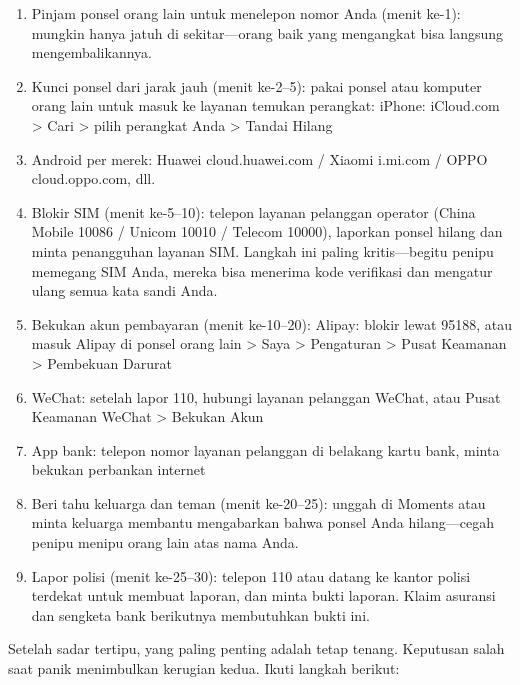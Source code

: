 \begin{enumerate}
  \item Pinjam ponsel orang lain untuk menelepon nomor Anda (menit ke-1): mungkin hanya jatuh di sekitar—orang baik yang mengangkat bisa langsung mengembalikannya.
  \item Kunci ponsel dari jarak jauh (menit ke-2–5): pakai ponsel atau komputer orang lain untuk masuk ke layanan temukan perangkat: iPhone: iCloud.com > Cari > pilih perangkat Anda > Tandai Hilang
  \item Android per merek: Huawei cloud.huawei.com / Xiaomi i.mi.com / OPPO cloud.oppo.com, dll.
  \item Blokir SIM (menit ke-5–10): telepon layanan pelanggan operator (China Mobile 10086 / Unicom 10010 / Telecom 10000), laporkan ponsel hilang dan minta penangguhan layanan SIM. Langkah ini paling kritis—begitu penipu memegang SIM Anda, mereka bisa menerima kode verifikasi dan mengatur ulang semua kata sandi Anda.
  \item Bekukan akun pembayaran (menit ke-10–20): Alipay: blokir lewat 95188, atau masuk Alipay di ponsel orang lain > Saya > Pengaturan > Pusat Keamanan > Pembekuan Darurat
  \item WeChat: setelah lapor 110, hubungi layanan pelanggan WeChat, atau Pusat Keamanan WeChat > Bekukan Akun
  \item App bank: telepon nomor layanan pelanggan di belakang kartu bank, minta bekukan perbankan internet
  \item Beri tahu keluarga dan teman (menit ke-20–25): unggah di Moments atau minta keluarga membantu mengabarkan bahwa ponsel Anda hilang—cegah penipu menipu orang lain atas nama Anda.
  \item Lapor polisi (menit ke-25–30): telepon 110 atau datang ke kantor polisi terdekat untuk membuat laporan, dan minta bukti laporan. Klaim asuransi dan sengketa bank berikutnya membutuhkan bukti ini.
\end{enumerate}


Setelah sadar tertipu, yang paling penting adalah tetap tenang. Keputusan salah saat panik menimbulkan kerugian kedua. Ikuti langkah berikut:

